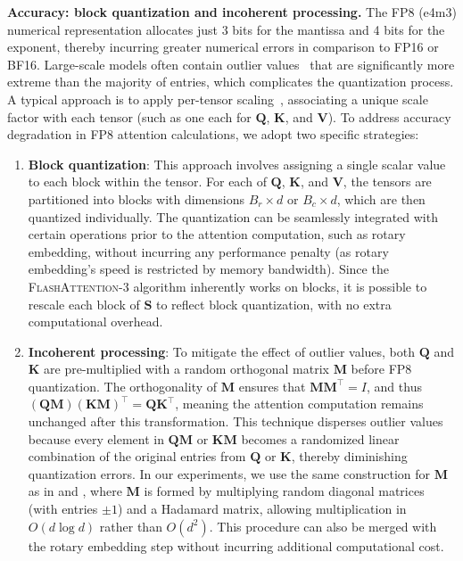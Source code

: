\begin{enumerate}
\textbf{Accuracy: block quantization and incoherent processing.} The FP8 (e4m3) numerical representation allocates just 3 bits for the mantissa and 4 bits for the exponent, thereby incurring greater numerical errors in comparison to FP16 or BF16. Large-scale models often contain outlier values~\citep{dettmers2208llm, sun2024massive} that are significantly more extreme than the majority of entries, which complicates the quantization process. A typical approach is to apply per-tensor scaling~\citep{micikevicius2022fp8}, associating a unique scale factor with each tensor (such as one each for $\mathbf{Q}$, $\mathbf{K}$, and $\mathbf{V}$). To address accuracy degradation in FP8 attention calculations, we adopt two specific strategies:

\begin{enumerate}

\item \textbf{Block quantization}: This approach involves assigning a single scalar value to each block within the tensor. For each of $\mathbf{Q}$, $\mathbf{K}$, and $\mathbf{V}$, the tensors are partitioned into blocks with dimensions $B_r \times d$ or $B_c \times d$, which are then quantized individually. The quantization can be seamlessly integrated with certain operations prior to the attention computation, such as rotary embedding, without incurring any performance penalty (as rotary embedding's speed is restricted by memory bandwidth). Since the \textsc{FlashAttention-3} algorithm inherently works on blocks, it is possible to rescale each block of $\mathbf{S}$ to reflect block quantization, with no extra computational overhead.

\item \textbf{Incoherent processing}: To mitigate the effect of outlier values, both $\mathbf{Q}$ and $\mathbf{K}$ are pre-multiplied with a random orthogonal matrix $\mathbf{M}$ before FP8 quantization. The orthogonality of $\mathbf{M}$ ensures that $\mathbf{M} \mathbf{M}^\top = I$, and thus $(\mathbf{Q} \mathbf{M}) (\mathbf{K} \mathbf{M})^\top = \mathbf{Q} \mathbf{K}^\top$, meaning the attention computation remains unchanged after this transformation. This technique disperses outlier values because every element in $\mathbf{Q} \mathbf{M}$ or $\mathbf{K} \mathbf{M}$ becomes a randomized linear combination of the original entries from $\mathbf{Q}$ or $\mathbf{K}$, thereby diminishing quantization errors. In our experiments, we use the same construction for $\mathbf{M}$ as in \citet{chee2024quip} and \citet{tseng2024quip}, where $\mathbf{M}$ is formed by multiplying random diagonal matrices (with entries $\pm 1$) and a Hadamard matrix, allowing multiplication in $O(d \log d)$ rather than $O(d^2)$. This procedure can also be merged with the rotary embedding step without incurring additional computational cost.
\end{enumerate}


\end{enumerate}
